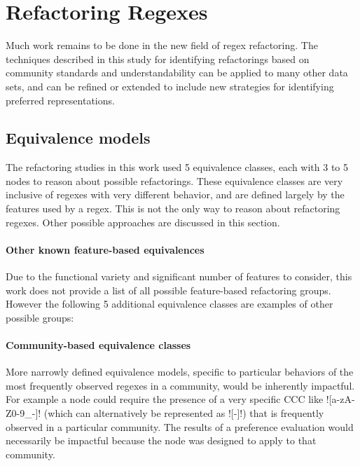 \section{Refactoring Regexes}
Much work remains to be done in the new field of regex refactoring.  The techniques described in this study for identifying refactorings based on community standards and understandability can be applied to many other data sets, and can be refined or extended to include new strategies for identifying preferred representations.

\subsection{Equivalence models}
\label{dis:equivalenceModels}
The refactoring studies in this work used 5 equivalence classes, each with 3 to 5 nodes to reason about possible refactorings.  These equivalence classes are very inclusive of regexes with very different behavior, and are defined largely by the features used by a regex.  This is not the only way to reason about refactoring regexes.  Other possible approaches are discussed in this section.

\paragraph{Other known feature-based equivalences}  Due to the functional variety and significant number of features to consider, this work does not provide a list of all possible feature-based refactoring groups.  However the following 5 additional equivalence classes are examples of other possible groups:

\paragraph{Community-based equivalence classes}  More narrowly defined equivalence models, specific to particular behaviors of the most frequently observed regexes in a community, would be inherently impactful.  For example a node could require the presence of a very specific CCC like \cverb![a-zA-Z0-9_-]! (which can alternatively be represented as \cverb![\w-]!) that is frequently observed in a particular community.  The results of a preference evaluation would necessarily be impactful because the node was designed to apply to that community.


